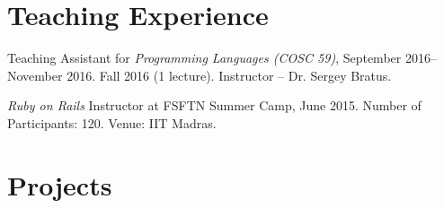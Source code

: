 \documentclass[letterpaper,10pt]{article}
\renewenvironment{itemize}{
	\begin{list}{}{
			\setlength{\leftmargin}{1.5em}
		}
	}{
	\end{list}
}
\begin{document}



\section*{Teaching Experience}
\begin{itemize}
	\setlength\itemsep{0ex}
	\item Teaching Assistant for \textit{Programming Languages (COSC 59)}, September 2016-- November 2016.
		\subitem Fall 2016 (1 lecture). Instructor -- Dr. Sergey Bratus.
	\item \textit{Ruby on Rails} Instructor at FSFTN Summer Camp, June 2015.
		\subitem Number of Participants: 120.
		\subitem Venue: IIT Madras.
\end{itemize}



\section*{Projects}
\end{document}
